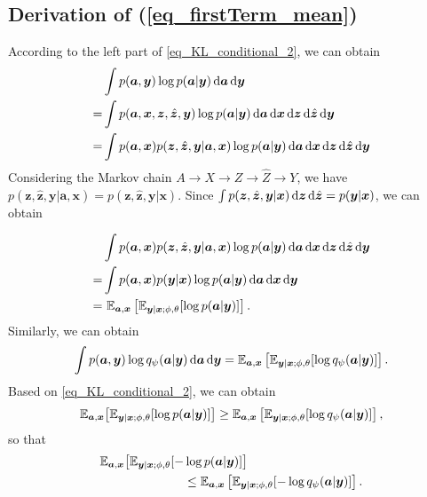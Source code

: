 \begin{appendices}

\section{Derivation of (\ref{eq_firstTerm_mean})}
\label{apd_fristTerm_mean}
According to the left part of \cref{eq_KL_conditional_2}, we can obtain
\begin{align}
    &\int p(\bm{a}, \bm{y})\log p(\bm{a} | \bm{y}) \dif\bm{a} \dif\bm{y} \notag \\
    =& \int p(\bm{a}, \bm{x}, \bm{z}, \hat{\bm{z}}, \bm{y})\log p(\bm{a} | \bm{y}) \dif\bm{a} \dif\bm{x} \dif\bm{z} \dif\hat{\bm{z}} \dif\bm{y} \notag \\
    =& \int p(\bm{a}, \bm{x}) p(\bm{z}, \hat{\bm{z}}, \bm{y} | \bm{a}, \bm{x})\log p(\bm{a} | \bm{y}) \dif\bm{a} \dif\bm{x} \dif\bm{z} \dif\hat{\bm{z}} \dif\bm{y} \notag
\end{align}
Considering the Markov chain \(A \rightarrow X \rightarrow Z \rightarrow \hat{Z} \rightarrow Y\), we have \( p(\bm{z}, \hat{\bm{z}}, \bm{y} | \bm{a}, \bm{x}) =  p(\bm{z}, \hat{\bm{z}}, \bm{y} | \bm{x})\). Since \(\int p(\bm{z}, \hat{\bm{z}}, \bm{y} | \bm{x}) \mathop{}\!\mathrm{d}\bm{z} \mathop{}\!\mathrm{d}\hat{\bm{z}} = p(\bm{y}|\bm{x})\), we can obtain

\begin{align}
    & \int p(\bm{a}, \bm{x}) p(\bm{z}, \hat{\bm{z}}, \bm{y} | \bm{a}, \bm{x})\log p(\bm{a} | \bm{y}) \dif\bm{a} \dif\bm{x} \dif\bm{z} \dif\hat{\bm{z}} \dif\bm{y} \notag \\
    =& \int p(\bm{a}, \bm{x}) p(\bm{y} | \bm{x})\log p(\bm{a} | \bm{y}) \dif\bm{a} \dif\bm{x} \dif\bm{y} \notag \\
    =&\ \mathbb{E}_{\bm{a},\bm{x}}\left[\mathbb{E}_{\bm{y}|\bm{x}; \phi,\theta}[\log p(\bm{a} | \bm{y})] \right]. \notag
\end{align}
Similarly, we can obtain
\begin{align}
    \int p(\bm{a},\bm{y})\log q_{\psi}(\bm{a}|\bm{y}) \mathop{}\!\mathrm{d}\bm{a}\mathop{}\!\mathrm{d}\bm{y} = \mathbb{E}_{\bm{a},\bm{x}}\left[\mathbb{E}_{\bm{y}|\bm{x};\phi,\theta}[\log q_{\psi}(\bm{a}|\bm{y})]\right]. \notag
\end{align}
Based on \cref{eq_KL_conditional_2}, we can obtain
\begin{align}
    \mathbb{E}_{\bm{a},\bm{x}}\big[\mathbb{E}_{\bm{y}|\bm{x}; \phi,\theta}[\log p(\bm{a} | \bm{y})] \big] \geq \mathbb{E}_{\bm{a},\bm{x}}\left[\mathbb{E}_{\bm{y}|\bm{x};\phi,\theta}[\log q_{\psi}(\bm{a}|\bm{y})]\right], \notag
\end{align}
so that
\begin{align}
    \mathbb{E}_{\bm{a},\bm{x}}\big[\mathbb{E}_{\bm{y}|\bm{x}; \phi,\theta}[-&\log p(\bm{a} | \bm{y})] \big] \notag \\
    &\leq \mathbb{E}_{\bm{a},\bm{x}}\left[\mathbb{E}_{\bm{y}|\bm{x};\phi,\theta}[-\log q_{\psi}(\bm{a}|\bm{y})]\right]. \notag
\end{align}


\end{appendices}
